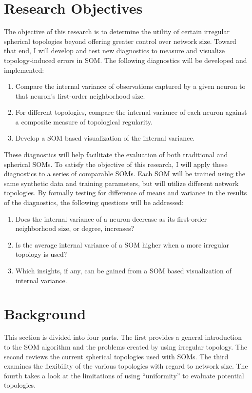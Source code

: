 \documentclass[10pt,titlepage]{article}
\begin{document}
\section{Research Objectives}
The objective of this research is to determine the utility of certain irregular
spherical topologies beyond offering greater control over network size. Toward that
end, I will develop and test new diagnostics to measure and visualize
topology-induced errors in SOM. The following diagnostics
will be developed and implemented:

\begin{enumerate}
    	\item Compare the internal variance of observations captured by a given neuron to that neuron's first-order neighborhood size.
	\item For different topologies, compare the internal variance of each neuron against a composite measure of topological regularity.
	\item Develop a SOM based visualization of the internal variance.
\end{enumerate}

These diagnostics will help facilitate the evaluation of both traditional and
spherical SOMs.  To satisfy the objective of this research, I will apply these
diagnostics to a series of comparable SOMs.  Each SOM will be trained using the
same synthetic data and training parameters, but will utilize different network
topologies.  By formally testing for difference of means and variance in the
results of the diagnostics, the following questions will be addressed:

\begin{enumerate}
	\item Does the internal variance of a neuron decrease as its first-order neighborhood size, or degree, increases?
	\item Is the average internal variance of a SOM higher when a more irregular topology is used?
	\item Which insights, if any, can be gained from a SOM based visualization of internal variance.
\end{enumerate}

\section{Background}
This section is divided into four parts.  The first provides a general
introduction to the SOM algorithm and the problems created by using irregular
topology. The second reviews the current spherical topologies used with SOMs.
The third examines the flexibility of the various topologies with regard to
network size. The fourth takes a look at the limitations of using ``uniformity''
to evaluate potential topologies.
\end{document}
